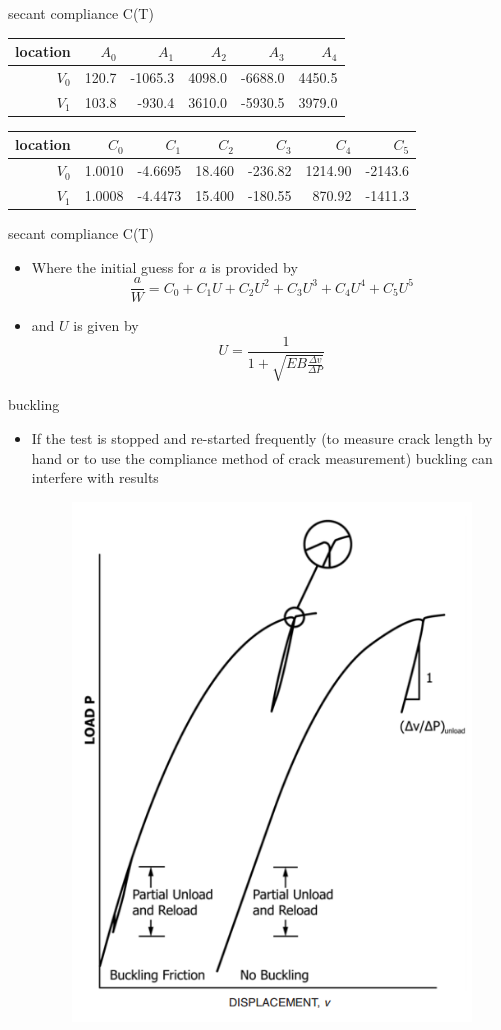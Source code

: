 \documentclass[10pt]{beamer}
\begin{document}
\begin{frame}{secant compliance C(T)}
	\begin{tabular}{rrrrrr}
	location	& $A_0$ & $A_1$ & $A_2$ & $A_3$ & $A_4$ \\ 
	\hline
	$V_0$	& 120.7 & -1065.3 & 4098.0 & -6688.0 & 4450.5 \\ 
	$V_1$	& 103.8 & -930.4 & 3610.0 & -5930.5 & 3979.0
	\end{tabular} 
	\begin{tabular}{rrrrrrr}
		location	& $C_0$ & $C_1$ & $C_2$ & $C_3$ & $C_4$ & $C_5$ \\ 
		\hline
		$V_0$	& 1.0010 & -4.6695 & 18.460 & -236.82 & 1214.90 & -2143.6\\ 
		$V_1$	& 1.0008 & -4.4473 & 15.400 & -180.55 & 870.92 & -1411.3
	\end{tabular} 
\end{frame}

\begin{frame}{secant compliance C(T)}
	\begin{itemize}
		\item Where the initial guess for $a$ is provided by
		\begin{equation}
		\frac{a}{W} = C_0 + C_1 U + C_2 U^2 + C_3 U^3 + C_4 U^4 + C_5 U^5
		\end{equation}
		\item and $U$ is given by
		\begin{equation}
		U = \frac{1}{1 + \sqrt{EB\frac{\Delta v}{\Delta P}}}
		\end{equation}
	\end{itemize}
\end{frame}

\begin{frame}{buckling}
	\begin{itemize}
		\item If the test is stopped and re-started frequently (to measure crack length by hand or to use the compliance method of crack measurement) buckling can interfere with results
		
\begin{figure}
\centering
\includegraphics[width=0.5\linewidth]{buckling}
\label{fig:buckling}
\end{figure}
	\end{itemize}
\end{frame}
\end{document}
